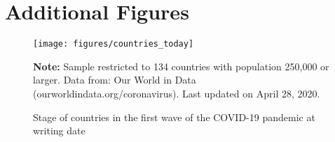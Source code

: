 \documentclass[12pt,english]{article}
\begin{document}
\section{Additional Figures\label{sec:Figures}}
\begin{spacing}{0.40000000000000002}

\setcounter{figure}{0}
\renewcommand\appendix{\par
  \renewcommand\thefigure{A\arabic{figure}}}
\appendix
\renewcommand*{\theHfigure}{\arabic{section}.{A\arabic{figure}}}


\begin{figure}[H]
	\singlespacing
	\centering
	 \caption{Stage of countries in the first wave of the COVID-19 pandemic at writing date}  \label{fig:current_stage}
	\resizebox{0.8\width}{!} {
		\begin{threeparttable}

 			  \texttt{[image: figures/countries\_today]}
  			 \begin{tablenotes}[flushleft]\vspace*{-7bp}
			\item \textbf{Note:} Sample restricted to 134 countries with population 250,000 or larger. Data from: Our World in Data (ourworldindata.org/coronavirus). Last updated on April 28, 2020.
			 \end{tablenotes}
  		\end{threeparttable}
 		}
  	 \onehalfspacing
\end{figure}

\end{spacing}
\end{document}
